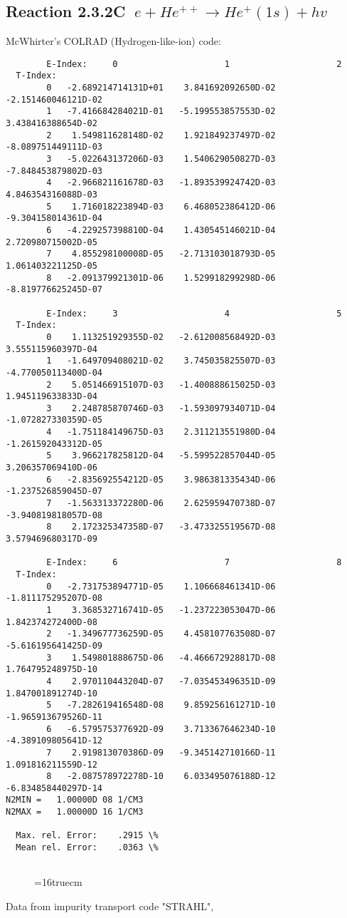 \documentclass[12pt,dvipdfmx]{article}
\begin{document}
\subsection{
Reaction 2.3.2C   $\  e + He^{++} \rightarrow  He^+(1s) + hv$
}
McWhirter's COLRAD (Hydrogen-like-ion) code: \cite{kn:McWhirter}
\begin{small}\begin{verbatim}
        E-Index:     0                     1                     2
  T-Index:
        0   -2.689214714131D+01    3.841692092650D-02   -2.151460046121D-02
        1   -7.416684284021D-01   -5.199553857553D-02    3.438416388654D-02
        2    1.549811628148D-02    1.921849237497D-02   -8.089751449111D-03
        3   -5.022643137206D-03    1.540629050827D-03   -7.848453879802D-03
        4   -2.966821161678D-03   -1.893539924742D-03    4.846354316088D-03
        5    1.716018223894D-03    6.468052386412D-06   -9.304158014361D-04
        6   -4.229257398810D-04    1.430545146021D-04    2.720980715002D-05
        7    4.855298100008D-05   -2.713103018793D-05    1.061403221125D-05
        8   -2.091379921301D-06    1.529918299298D-06   -8.819776625245D-07

        E-Index:     3                     4                     5
  T-Index:
        0    1.113251929355D-02   -2.612008568492D-03    3.555115960397D-04
        1   -1.649709408021D-02    3.745035825507D-03   -4.770050113400D-04
        2    5.051466915107D-03   -1.400888615025D-03    1.945119633833D-04
        3    2.248785870746D-03   -1.593097934071D-04   -1.072827330359D-05
        4   -1.751184149675D-03    2.311213551980D-04   -1.261592043312D-05
        5    3.966217825812D-04   -5.599522857044D-05    3.206357069410D-06
        6   -2.835692554212D-05    3.986381335434D-06   -1.237526859045D-07
        7   -1.563313372280D-06    2.625959470738D-07   -3.940819818057D-08
        8    2.172325347358D-07   -3.473325519567D-08    3.579469680317D-09

        E-Index:     6                     7                     8
  T-Index:
        0   -2.731753894771D-05    1.106668461341D-06   -1.811175295207D-08
        1    3.368532716741D-05   -1.237223053047D-06    1.842374272400D-08
        2   -1.349677736259D-05    4.458107763508D-07   -5.616195641425D-09
        3    1.549801888675D-06   -4.466672928817D-08    1.764795248975D-10
        4    2.970110443204D-07   -7.035453496351D-09    1.847001891274D-10
        5   -7.282619416548D-08    9.859256161271D-10   -1.965913679526D-11
        6   -6.579575377692D-09    3.713367646234D-10   -4.389109805641D-12
        7    2.919813070386D-09   -9.345142710166D-11    1.091816211559D-12
        8   -2.087578972278D-10    6.033495076188D-12   -6.834858440297D-14
N2MIN =   1.00000D 08 1/CM3
N2MAX =   1.00000D 16 1/CM3

  Max. rel. Error:    .2915 \%
  Mean rel. Error:    .0363 \%


\end{verbatim}\end{small}
\begin{figure} \label{2.3.2C}
\epsfxsize=16truecm
\end{figure}
\newpage
Data from impurity transport code "STRAHL", \cite{kn:Behringer}
\end{document}
